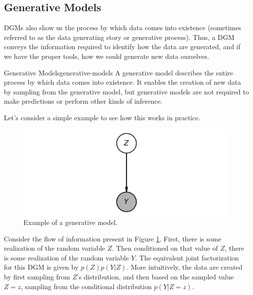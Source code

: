 \subsection{Generative Models}
DGMs also show us the process by which data comes into existence (sometimes referred to as the data generating story or generative process). Thus, a DGM conveys the information required to identify how the data are generated, and if we have the proper tools, how we could generate new data ourselves.

\begin{definition}{Generative Models}{generative-models}
    A generative model describes the entire process by which data comes into existence. It enables the creation of new data by sampling from the generative model, but generative models are not required to make predictions or perform other kinds of inference.
\end{definition}


Let's consider a simple example to see how this works in practice.
\begin{figure}
    \centering
    \includegraphics[width=0.5\paperwidth]{../GraphicalModels/fig/GenerativeRVExample.png}
    \caption{Example of a generative model.}
    \label{fig:generative-rv}
\end{figure}
Consider the flow of information present in Figure \ref{fig:generative-rv}. First, there is some realization of the random variable $Z$. Then conditioned on that value of $Z$, there is some realization of the random variable $Y$. The equivalent joint factorization for this DGM is given by $p(Z)p(Y|Z)$. More intuitively, the data are created by first sampling from $Z$'s distribution, and then based on the sampled value $Z=z$, sampling from the conditional distribution $p(Y|Z=z)$.

